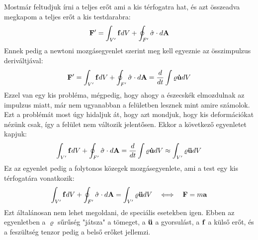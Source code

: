 \documentclass[a4paper,12pt]{article}
\begin{document}
Mostmár feltudjuk írni a teljes erőt ami a kis térfogatra hat, és azt összeadva megkapom a teljes erőt a kis testdarabra:
\begin{equation}
    \bold{F}' = \int_{V'} \bold{f} dV + \oint_{F'} \hat{\sigma} \cdot d\bold{A}
\end{equation}
Ennek pedig a newtoni mozgásegyenlet szerint meg kell egyeznie az összimpulzus deriváltjával:
\begin{equation}
    \bold{F}' = \int_{V'} \bold{f} dV + \oint_{F'} \hat{\sigma} \cdot d\bold{A} = \frac{d}{dt} \int \varrho \bold{\dot{u}} dV
\end{equation}
Ezzel van egy kis probléma, mégpedig, hogy ahogy a észecskék elmozdulnak az impulzus miatt, már nem ugyanabban a felületben lesznek mint amire számolok.
Ezt a problémát most úgy hidaljuk át, hogy azt mondjuk, hogy kis deformációkat nézünk csak, így a felület nem változik jelentősen. Ekkor a következő egyenletet kapjuk:
\begin{equation}
     \int_{V'} \bold{f} dV + \oint_{F'} \hat{\sigma} \cdot d\bold{A} =\frac{d}{dt} \int \varrho \bold{\dot{u}} dV \approx \int_{V'} \varrho \bold{\ddot{u}} dV
\end{equation}
Ez az egyenlet pedig a folytonos közegek mozgásegyenlete, ami a test egy kis térfogatára vonatkozik:
\begin{equation}
    \int_{V'} \bold{f} dV + \oint_{F'} \hat{\sigma} \cdot d\bold{A} = \int_{V'} \varrho \bold{\ddot{u}} dV \quad \Longleftrightarrow \quad \bold{F} = m \bold{a}
\end{equation}
Ezt általánosan nem lehet megoldani, de speciális esetekben igen. Ebben az egyenletben a $\varrho$ sűrűség "játsza" a tömeget, a $\bold{\ddot{u}}$ a gyorsulást, 
a $\bold{f}$ a külső erőt, és a feszültség tenzor pedig a belső erőket jellemzi.
\end{document}
